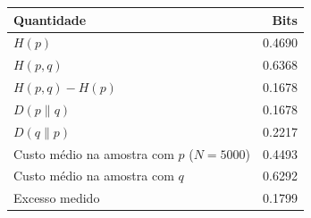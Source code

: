 \begin{tabular}{lr}
\toprule
Quantidade & Bits \\
\midrule
$H(p)$ & 0.4690 \\
$H(p,q)$ & 0.6368 \\
$H(p,q)-H(p)$ & 0.1678 \\
$D(p\|q)$ & 0.1678 \\
$D(q\|p)$ & 0.2217 \\
Custo médio na amostra com $p$ ($N=5000$) & 0.4493 \\
Custo médio na amostra com $q$ & 0.6292 \\
Excesso medido & 0.1799 \\
\bottomrule
\end{tabular}
